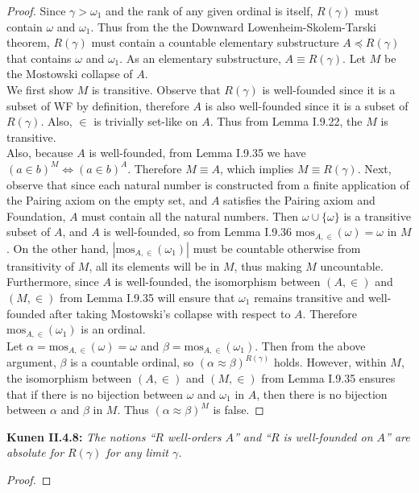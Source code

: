 \documentclass{article}
\begin{document}
  \begin{proof}
    Since $\gamma>\omega_1$ and the rank of any given ordinal is itself,
    $R(\gamma)$ must contain $\omega$ and $\omega_1$. Thus from the
    the Downward Lowenheim-Skolem-Tarski theorem, $R(\gamma)$ must contain
    a countable elementary substructure $A\preceq R(\gamma)$ that contains
    $\omega$ and $\omega_1$. As an elementary substructure, $A\equiv
    R(\gamma)$. Let $M$ be the Mostowski collapse of $A$. \\
    
    We first show $M$ is transitive. Observe that $R(\gamma)$ is
    well-founded since it is a subset of WF by definition, therefore $A$ is
    also well-founded since it is a subset of $R(\gamma)$. Also, $\in$ is
    trivially set-like on $A$. Thus from Lemma I.9.22, the $M$ is
    transitive. \\

    Also, because $A$ is well-founded, from Lemma I.9.35 we have $(a\in
    b)^M \Leftrightarrow (a\in b)^A$. Therefore $M\equiv A$, which implies
    $M\equiv R(\gamma)$. Next, observe that since each natural number is
    constructed from a finite application of the Pairing axiom on the empty
    set, and $A$ satisfies the Pairing axiom and Foundation, $A$ must
    contain all the natural numbers. Then $\omega\cup\{\omega\}$ is a
    transitive subset of $A$, and $A$ is well-founded, so from Lemma I.9.36
    $\text{mos}_{A,\in}(\omega)=\omega$ in $M$. On the other hand,
    $|\text{mos}_{A,\in}(\omega_1)|$ must be countable otherwise from
    transitivity of $M$, all its elements will be in $M$, thus making $M$
    uncountable. Furthermore, since $A$ is well-founded, the isomorphism
    between $(A,\in)$ and $(M,\in)$ from Lemma I.9.35 will ensure that
    $\omega_1$ remains transitive and well-founded after taking Mostowski's
    collapse with respect to $A$. Therefore $\text{mos}_{A,\in}(\omega_1)$
    is an ordinal. \\

    Let $\alpha=\text{mos}_{A,\in}(\omega)=\omega$ and
    $\beta=\text{mos}_{A,\in}(\omega_1)$. Then from the above argument,
    $\beta$ is a countable ordinal, so $(\alpha\approx\beta)^{R(\gamma)}$
    holds. However, within $M$, the isomorphism between $(A,\in)$ and
    $(M,\in)$ from Lemma I.9.35 ensures that if there is no bijection
    between $\omega$ and $\omega_1$ in $A$, then there is no bijection
    between $\alpha$ and $\beta$ in $M$. Thus
    $(\alpha\approx\beta)^{M}$ is false.
  \end{proof}

\textbf{Kunen II.4.8:} \it The notions ``$R$ well-orders $A$'' and ``$R$ is
  well-founded on $A$'' are absolute for $R(\gamma)$ for any limit
  $\gamma$.

  \begin{proof}
  \end{proof}
\end{document}
